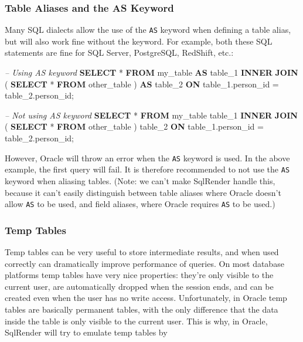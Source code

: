 \documentclass[11pt]{book}
\newenvironment{Shaded}{\begin{snugshade}}{\end{snugshade}}
\newcommand{\KeywordTok}[1]{\textcolor[rgb]{0.13,0.29,0.53}{\textbf{#1}}}
\newcommand{\DecValTok}[1]{\textcolor[rgb]{0.00,0.00,0.81}{#1}}
\newcommand{\CommentTok}[1]{\textcolor[rgb]{0.56,0.35,0.01}{\textit{#1}}}
\newcommand{\NormalTok}[1]{#1}
\theoremstyle{definition}
\theoremstyle{definition}
\theoremstyle{definition}
\theoremstyle{remark}
\begin{document}
\subsubsection*{Table Aliases and the AS
Keyword}\label{table-aliases-and-the-as-keyword}

Many SQL dialects allow the use of the \texttt{AS} keyword when defining
a table alias, but will also work fine without the keyword. For example,
both these SQL statements are fine for SQL Server, PostgreSQL, RedShift,
etc.:

\begin{Shaded}
\begin{Highlighting}[]
\CommentTok{-- Using AS keyword}
\KeywordTok{SELECT}\NormalTok{ * }
\KeywordTok{FROM}\NormalTok{ my_table }\KeywordTok{AS}\NormalTok{ table_}\DecValTok{1}
\KeywordTok{INNER} \KeywordTok{JOIN}\NormalTok{ (}
  \KeywordTok{SELECT}\NormalTok{ * }\KeywordTok{FROM}\NormalTok{ other_table}
\NormalTok{) }\KeywordTok{AS}\NormalTok{ table_}\DecValTok{2}
\KeywordTok{ON}\NormalTok{ table_1.person_id = table_2.person_id;}

\CommentTok{-- Not using AS keyword}
\KeywordTok{SELECT}\NormalTok{ * }
\KeywordTok{FROM}\NormalTok{ my_table table_}\DecValTok{1}
\KeywordTok{INNER} \KeywordTok{JOIN}\NormalTok{ (}
  \KeywordTok{SELECT}\NormalTok{ * }\KeywordTok{FROM}\NormalTok{ other_table}
\NormalTok{) table_}\DecValTok{2}
\KeywordTok{ON}\NormalTok{ table_1.person_id = table_2.person_id;}
\end{Highlighting}
\end{Shaded}

However, Oracle will throw an error when the \texttt{AS} keyword is
used. In the above example, the first query will fail. It is therefore
recommended to not use the \texttt{AS} keyword when aliasing tables.
(Note: we can't make SqlRender handle this, because it can't easily
distinguish between table aliases where Oracle doesn't allow \texttt{AS}
to be used, and field aliases, where Oracle requires \texttt{AS} to be
used.)

\subsubsection*{Temp Tables}\label{temp-tables}

Temp tables can be very useful to store intermediate results, and when
used correctly can dramatically improve performance of queries. On most
database platforms temp tables have very nice properties: they're only
visible to the current user, are automatically dropped when the session
ends, and can be created even when the user has no write access.
Unfortunately, in Oracle temp tables are basically permanent tables,
with the only difference that the data inside the table is only visible
to the current user. This is why, in Oracle, SqlRender will try to
emulate temp tables by
\end{document}

